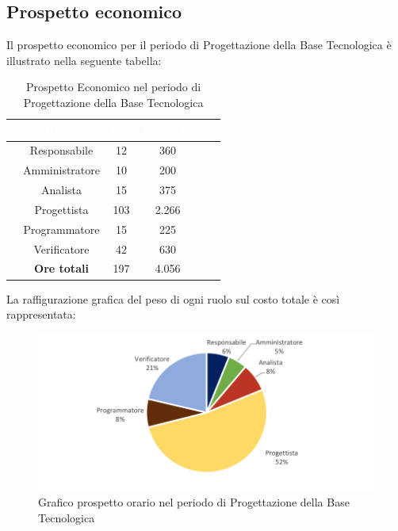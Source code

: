 \subsection{Prospetto economico}
Il prospetto economico per il periodo di Progettazione della Base Tecnologica è illustrato nella seguente tabella:

\begin{table}[ht]
	\begin{center}
		\begin{tabular}{cccccc}
			\rowcolor{coolblack}
			\hline
			&\textcolor{white}{Ruolo}&	\textcolor{white}{Ore} &\textcolor{white}{Costo(\euro)} \\
			\hline
			&Responsabile           &12&360 \\
			&Amministratore        & 10& 200 \\
			&Analista                   & 15& 375 \\
			&Progettista              &  103& 2.266\\
			&Programmatore       & 15& 225 \\
			&Verificatore             & 42& 630 \\
			\hline
			&\textbf{Ore totali}    &197&4.056\\
		\end{tabular}
		\caption{Prospetto Economico nel periodo di Progettazione della Base Tecnologica}
	\end{center}
\end{table}


La raffigurazione grafica del peso di ogni ruolo sul costo totale è così rappresentata:
\begin{figure}[!ht]
	\begin{center}
		\includegraphics{images/grafoProgettazioneTecnologicaEuro.png}
		\caption{Grafico prospetto orario nel periodo di Progettazione della Base Tecnologica}
	\end{center}
\end{figure}
\newpage
